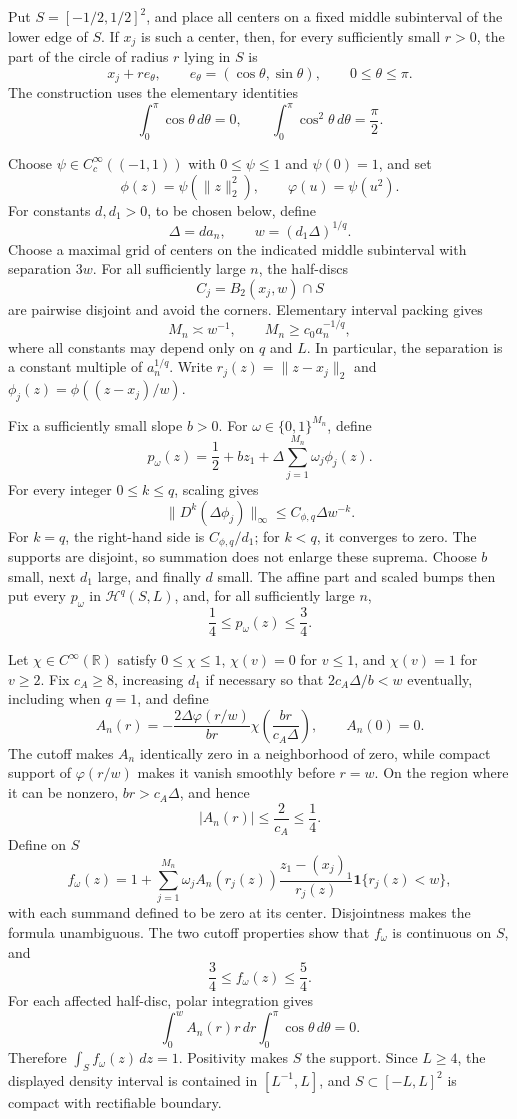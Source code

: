 Put \(S=[-1/2,1/2]^2\), and place all centers on a fixed middle subinterval of the lower edge of \(S\).  If \(x_j\) is such a center, then, for every sufficiently small \(r>0\), the part of the circle of radius \(r\) lying in \(S\) is
\[
 x_j+r e_\theta,
 \qquad e_\theta=(\cos\theta,\sin\theta),
 \qquad 0\leq\theta\leq\pi.
\]
The construction uses the elementary identities
\[
 \int_0^\pi\cos\theta\,d\theta=0,
 \qquad
 \int_0^\pi\cos^2\theta\,d\theta=\frac\pi2.
\]

Choose \(\psi\in C_c^\infty((-1,1))\) with \(0\leq\psi\leq1\) and \(\psi(0)=1\), and set
\[
 \phi(z)=\psi(\lVert z\rVert_2^2),
 \qquad
 \varphi(u)=\psi(u^2).
\]
For constants \(d,d_1>0\), to be chosen below, define
\[
 \Delta=d a_n,
 \qquad
 w=(d_1\Delta)^{1/q}.
\]
Choose a maximal grid of centers on the indicated middle subinterval with separation \(3w\).  For all sufficiently large \(n\), the half-discs
\[
 C_j=B_2(x_j,w)\cap S
\]
are pairwise disjoint and avoid the corners.  Elementary interval packing gives
\[
 M_n\asymp w^{-1},
 \qquad
 M_n\geq c_0a_n^{-1/q},
\]
where all constants may depend only on \(q\) and \(L\).  In particular, the separation is a constant multiple of \(a_n^{1/q}\).  Write \(r_j(z)=\lVert z-x_j\rVert_2\) and \(\phi_j(z)=\phi((z-x_j)/w)\).

Fix a sufficiently small slope \(b>0\).  For \(\omega\in\{0,1\}^{M_n}\), define
\[
 p_\omega(z)=\frac12+bz_1+\Delta\sum_{j=1}^{M_n}\omega_j\phi_j(z).
\]
For every integer \(0\leq k\leq q\), scaling gives
\[
 \lVert D^k(\Delta\phi_j)\rVert_\infty
 \leq C_{\phi,q}\Delta w^{-k}.
\]
For \(k=q\), the right-hand side is \(C_{\phi,q}/d_1\); for \(k<q\), it converges to zero.  The supports are disjoint, so summation does not enlarge these suprema.  Choose \(b\) small, next \(d_1\) large, and finally \(d\) small.  The affine part and scaled bumps then put every \(p_\omega\) in \(\mathcal H^q(S,L)\), and, for all sufficiently large \(n\),
\[
 \frac14\leq p_\omega(z)\leq\frac34.
\]

Let \(\chi\in C^\infty(\mathbb R)\) satisfy \(0\leq\chi\leq1\), \(\chi(v)=0\) for \(v\leq1\), and \(\chi(v)=1\) for \(v\geq2\).  Fix \(c_A\geq8\), increasing \(d_1\) if necessary so that \(2c_A\Delta/b<w\) eventually, including when \(q=1\), and define
\[
 A_n(r)=-\frac{2\Delta\varphi(r/w)}{br}
 \chi\!\left(\frac{br}{c_A\Delta}\right),
 \qquad A_n(0)=0.
\]
The cutoff makes \(A_n\) identically zero in a neighborhood of zero, while compact support of \(\varphi(r/w)\) makes it vanish smoothly before \(r=w\).  On the region where it can be nonzero, \(br>c_A\Delta\), and hence
\[
 |A_n(r)|\leq\frac{2}{c_A}\leq\frac14.
\]
Define on \(S\)
\[
 f_\omega(z)=1+
 \sum_{j=1}^{M_n}\omega_j A_n(r_j(z))
 \frac{z_1-(x_j)_1}{r_j(z)}\mathbf 1\{r_j(z)<w\},
\]
with each summand defined to be zero at its center.  Disjointness makes the formula unambiguous.  The two cutoff properties show that \(f_\omega\) is continuous on \(S\), and
\[
 \frac34\leq f_\omega(z)\leq\frac54.
\]
For each affected half-disc, polar integration gives
\[
 \int_0^w A_n(r)r\,dr\int_0^\pi\cos\theta\,d\theta=0.
\]
Therefore \(\int_S f_\omega(z)\,dz=1\).  Positivity makes \(S\) the support.  Since \(L\geq4\), the displayed density interval is contained in \([L^{-1},L]\), and \(S\subset[-L,L]^2\) is compact with rectifiable boundary.


